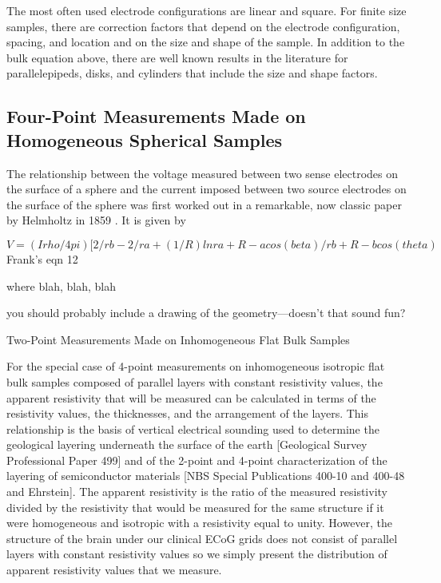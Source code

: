 The most often used electrode configurations are linear and square. For finite size samples, there are correction factors that depend on the electrode configuration, spacing, and location and on the size and shape of the sample. In addition to the bulk equation above, there are well known results in the literature for parallelepipeds, disks, and cylinders that include the size and shape factors.

\subsection{Four-Point Measurements Made on Homogeneous Spherical Samples}

The relationship between the voltage measured between two sense electrodes on the surface of a sphere and the current imposed between two source electrodes on the surface of the sphere was first worked out in a remarkable, now classic paper by Helmholtz in 1859 \cite{Wilson1950}. It is given by \cite{Frank1952}

$$ V = (I rho / 4 pi) [ 2/rb -2/ra + (1/R) ln {ra+R-a cos(beta) / rb+R-b cos(theta)} $$ Frank’s eqn 12

where blah, blah, blah

you should probably include a drawing of the geometry—doesn’t that sound fun?

Two-Point Measurements Made on Inhomogeneous Flat Bulk Samples

For the special case of 4-point measurements on inhomogeneous isotropic flat bulk samples composed of parallel layers with constant resistivity values, the apparent resistivity that will be measured can be calculated in terms of the resistivity values, the thicknesses, and the arrangement of the layers. This relationship is the basis of vertical electrical sounding used to determine the geological layering underneath the surface of the earth [Geological Survey Professional Paper 499] and of the 2-point and 4-point characterization of the layering of semiconductor materials [NBS Special Publications 400-10 and 400-48 and Ehrstein]. The apparent resistivity is the ratio of the measured resistivity divided by the resistivity that would be measured for the same structure if it were homogeneous and isotropic with a resistivity equal to unity. However, the structure of the brain under our clinical ECoG grids does not consist of parallel layers with constant resistivity values so we simply present the distribution of apparent resistivity values that we measure.

